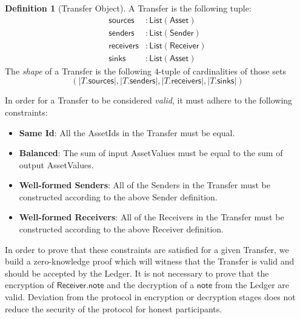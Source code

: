 \documentclass[a4paper]{article}
\theoremstyle{definition}
\newtheorem{definition}{Definition}[subsection]
\renewcommand{\abs}[1]{\left|#1\right|}
\newcommand{\AssetId}{{\textsf{AssetId}}}
\newcommand{\AssetValue}{{\textsf{AssetValue}}}
\newcommand{\Asset}{{\textsf{Asset}}}
\newcommand{\Ledger}{{\textsf{Ledger}}}
\newcommand{\List}{{\textsf{List}}}
\newcommand{\Receiver}{{\textsf{Receiver}}}
\newcommand{\Sender}{{\textsf{Sender}}}
\newcommand{\Transfer}{{\textsf{Transfer}}}
\newcommand{\note}{{\textsf{note}}}
\newcommand{\receivers}{{\textsf{receivers}}}
\newcommand{\senders}{{\textsf{senders}}}
\newcommand{\sinks}{{\textsf{sinks}}}
\newcommand{\sources}{{\textsf{sources}}}
\begin{document}
\begin{definition}[\Transfer{} Object]
    A \Transfer{} is the following tuple:
    \begin{align*}
        \sources    &: \List(\Asset) \\
        \senders    &: \List(\Sender) \\
        \receivers  &: \List(\Receiver) \\
        \sinks      &: \List(\Asset)
    \end{align*}
    The \emph{shape} of a \Transfer{} is the following $4$-tuple of cardinalities of those sets
    \[\left(\abs{T.\sources}, \abs{T.\senders}, \abs{T.\receivers}, \abs{T.\sinks}\right)\]
\end{definition}

In order for a \Transfer{} to be considered \emph{valid}, it must adhere to the following constraints:

\begin{itemize}
    \item \textbf{Same Id}: All the \AssetId{s} in the \Transfer{} must be equal.
    \item \textbf{Balanced}: The sum of input \AssetValue{s} must be equal to the sum of output \AssetValue{s}.
    \item \textbf{Well-formed Senders}: All of the \Sender{s} in the \Transfer{} must be constructed according to the above \Sender{} definition.
    \item \textbf{Well-formed Receivers}: All of the \Receiver{s} in the \Transfer{} must be constructed according to the above \Receiver{} definition.
\end{itemize}

In order to prove that these constraints are satisfied for a given \Transfer{}, we build a zero-knowledge proof which will witness that the \Transfer{} is valid and should be accepted by the \Ledger{}. It is not necessary to prove that the encryption of $\Receiver.\note$ and the decryption of a $\note$ from the \Ledger{} are valid. Deviation from the protocol in encryption or decryption stages does not reduce the security of the protocol for honest participants.
\end{document}
